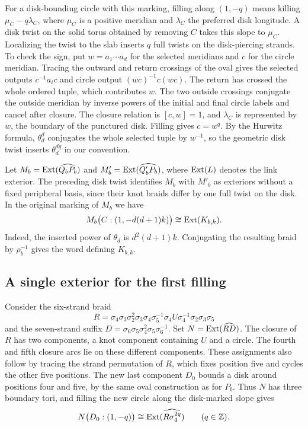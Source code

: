 For a disk-bounding circle with this marking, filling along
\((1,-q)\) means killing \(\mu_C-q\lambda_C\), where \(\mu_C\)
is a positive meridian and \(\lambda_C\) the preferred disk
longitude. A disk twist on the solid torus obtained by removing \(C\)
takes this slope to \(\mu_C\). Localizing the twist to the slab
inserts \(q\) full twists on the disk-piercing strands. To check the
sign, put \(w=a_1\cdots a_d\) for the selected meridians and \(c\)
for the circle meridian. Tracing the outward and return crossings
of the oval gives the selected outputs \(c^{-1}a_i c\) and circle
output \((wc)^{-1}c(wc)\). The return has crossed the whole ordered
tuple, which contributes \(w\). The two outside crossings conjugate
the outside meridian by inverse powers of the initial and final
circle labels and cancel after closure. The closure relation is
\([c,w]=1\), and \(\lambda_C\) is represented by \(w\), the
boundary of the punctured disk. Filling gives \(c=w^q\).
By the Hurwitz formula, \(\theta_d^d\) conjugates the whole
selected tuple by \(w^{-1}\), so the geometric disk twist inserts
\(\theta_d^{dq}\) in our convention.

Let \(M_b=\operatorname{Ext}(\widehat{Q_bP_b})\) and \(M'_b=\operatorname{Ext}(\widehat{Q'_bP_b})\),
where \(\operatorname{Ext}(L)\) denotes the link exterior. The preceding disk
twist identifies \(M_b\) with \(M'_b\) as exteriors without a
fixed peripheral basis, since their knot braids differ by one full
twist on the disk. In the original marking of \(M_b\) we have
\begin{equation}\label{eq:kfilling}
      M_b\bigl(C:(1,-d(d+1)k)\bigr)\cong \operatorname{Ext}(K_{b,k}).
\end{equation}
Indeed, the inserted power of \(\theta_d\) is \(d^2(d+1)k\).
Conjugating the resulting braid by \(\rho_b^{-1}\) gives the word
defining \(K_{b,k}\).

\subsection{A single exterior for the first filling}

Consider the six-strand braid
\[
 R=\sigma_4\sigma_3\sigma_2^2\sigma_3\sigma_4\sigma_5^{-1}
                 \sigma_4 U\sigma_4^{-1}\sigma_2\sigma_3\sigma_5
\]
and the seven-strand suffix \(D=\sigma_6\sigma_5\sigma_4^2
\sigma_5\sigma_6^{-1}\). Set \(N=\operatorname{Ext}(\widehat{RD})\).
The closure of \(R\) has two components, a knot component containing
\(U\) and a circle. The fourth and fifth closure arcs lie on these
different components. These assignments also follow by tracing the
strand permutation of \(R\), which fixes position five and cycles
the other five positions. The new last component \(D_0\) bounds a
disk around positions four and five, by the same oval
construction as for \(P_b\). Thus \(N\) has three boundary tori,
and filling the new circle along the disk-marked slope gives
\begin{equation}\label{eq:nfilling}
      N\bigl(D_0:(1,-q)\bigr)\cong\operatorname{Ext}(\widehat{R\sigma_4^{2q}})
                         \qquad(q\in\mathbb Z).
\end{equation}


